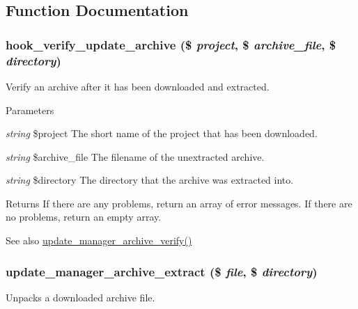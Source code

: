 \subsection{Function Documentation}
\hypertarget{group__update__manager__file_ga68a5dd6bec824909f46d9458991eaf42}{
\subsubsection[{hook\_\-verify\_\-update\_\-archive}]{\setlength{\rightskip}{0pt plus 5cm}hook\_\-verify\_\-update\_\-archive (\$ {\em project}, \/  \$ {\em archive\_\-file}, \/  \$ {\em directory})}}
\label{group__update__manager__file_ga68a5dd6bec824909f46d9458991eaf42}
Verify an archive after it has been downloaded and extracted.


\begin{DoxyParams}{Parameters}
\item[{\em string}]\$project The short name of the project that has been downloaded. \item[{\em string}]\$archive\_\-file The filename of the unextracted archive. \item[{\em string}]\$directory The directory that the archive was extracted into.\end{DoxyParams}
\begin{DoxyReturn}{Returns}
If there are any problems, return an array of error messages. If there are no problems, return an empty array.
\end{DoxyReturn}
\begin{DoxySeeAlso}{See also}
\hyperlink{group__update__manager__file_ga8c352241e56ce6de6b1064725d84801b}{update\_\-manager\_\-archive\_\-verify()} 
\end{DoxySeeAlso}
\hypertarget{group__update__manager__file_gaacbdc92035b1bb68dbb741a4917b8185}{
\subsubsection[{update\_\-manager\_\-archive\_\-extract}]{\setlength{\rightskip}{0pt plus 5cm}update\_\-manager\_\-archive\_\-extract (\$ {\em file}, \/  \$ {\em directory})}}
\label{group__update__manager__file_gaacbdc92035b1bb68dbb741a4917b8185}
Unpacks a downloaded archive file.


